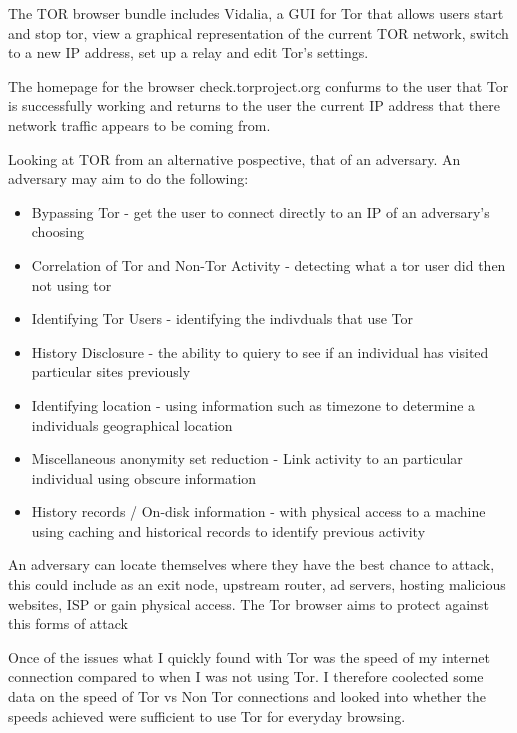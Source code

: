 \documentclass[12pt,a4paper,oneside]{article}
\begin{document}
The TOR browser bundle includes Vidalia, a GUI for Tor that allows users start and stop tor, view a graphical representation of the current TOR network, switch to a new IP address, set up a relay and edit Tor's settings.

The homepage for the browser check.torproject.org confurms to the user that Tor is successfully working and returns to the user the current IP address that there network traffic appears to be coming from.

Looking at TOR from an alternative pospective, that of an adversary. An adversary may aim to do the following:
\begin{itemize}
\item Bypassing Tor - get the user to connect directly to an IP of an adversary's choosing
\item Correlation of Tor and Non-Tor Activity - detecting what a tor user did then not using tor
\item Identifying Tor Users - identifying the indivduals that use Tor
\item History Disclosure - the ability to quiery to see if an individual has visited particular sites previously
\item Identifying location - using information such as timezone to determine a individuals geographical location
\item Miscellaneous anonymity set reduction - Link activity to an particular individual using obscure information
\item History records / On-disk information - with physical access to a machine using caching and historical records to identify previous activity
\end{itemize}

An adversary can locate themselves where they have the best chance to attack, this could include as an exit node, upstream router, ad servers, hosting malicious websites, ISP or gain physical access. The Tor browser aims to protect against this forms of attack 

Once of the issues what I quickly found with Tor was the speed of my internet connection compared to when I was not using Tor. I therefore coolected some data on the speed of Tor vs Non Tor connections and looked into whether the speeds achieved were sufficient to use Tor for everyday browsing.  
\end{document}
